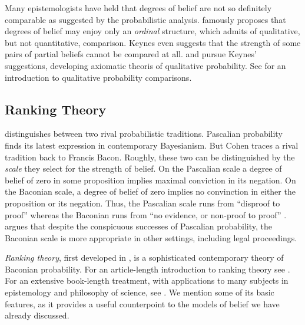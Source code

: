 Many epistemologists have held that degrees of belief are not so definitely
comparable as suggested by the probabilistic analysis.
\citet{keynes1921treatise} famously proposes that degrees of belief may enjoy
only an {\em ordinal} structure, which admits of qualitative, but not
quantitative, comparison. Keynes even suggests that the strength of some pairs
of partial beliefs cannot be compared at all. \citet{koopman1940axioms} and
\citet{fine1973theories} pursue Keynes' suggestions, developing axiomatic
theoris of qualitative probability. See \citet{konek2019comparative} for an
introduction to qualitative probability comparisons. 

\subsection{Ranking Theory}
\label{rankingtheory}

 distinguishes between two rival
probabilistic traditions. Pascalian probability finds its latest expression in
contemporary Bayesianism. But Cohen traces a rival tradition back to Francis
Bacon. Roughly, these two can be distinguished by the {\em scale} they select
for the strength of belief. On the Pascalian scale a degree of belief of zero in
some proposition implies maximal conviction in its negation. On the Baconian
scale, a degree of belief of zero implies no convinction in either the
proposition or its negation. Thus, the Pascalian scale runs from ``disproof to
proof'' whereas the Baconian runs from ``no evidence, or non-proof to proof''
\citep[p. 224]{cohen1980some}.  \citet{cohen1977probable} argues that despite
the conspicuous successes of Pascalian probability, the Baconian scale is more
appropriate in other settings, including legal proceedings.

{\em Ranking theory}, first developed in \citet{spohn1988ordinal}, is a
sophisticated contemporary theory of Baconian probability. For an article-length
introduction to ranking theory see \citet{huber2013ranking, huber2019ranking}.
For an extensive book-length treatment, with applications to many subjects in
epistemology and philosophy of science, see \citet{spohn2012laws}. We mention
some of its basic features, as it provides a useful counterpoint to the models
of belief we have already discussed.

